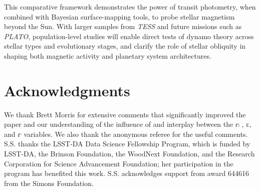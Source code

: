 \documentclass[twocolumn]{aastex631}
\begin{document}
This comparative framework demonstrates the power of transit photometry, when combined with
Bayesian surface-mapping tools, to probe stellar magnetism beyond the Sun. With larger samples
from \textit{TESS} and future missions such as \textit{PLATO}, population-level studies will enable
direct tests of dynamo theory across stellar types and evolutionary stages, and clarify the role of
stellar obliquity in shaping both magnetic activity and planetary system architectures.


\section*{Acknowledgments}
We thank Brett Morris for extensive comments that significantly improved the paper and our understanding of the 
influence of and interplay between the $\mathbb{n}$ , $\mathbb{c}$, and $\mathbb{r}$ variables. We also thank the anonymous referee
for the useful comments.
S.S. thanks the LSST-DA Data Science Fellowship Program, which is funded by LSST-DA, the Brinson Foundation, 
the WoodNext Foundation, and the Research Corporation for Science Advancement Foundation; 
her participation in the program has benefited this work. S.S. acknowledges support from award 644616 from the Simons Foundation.


\end{document}
